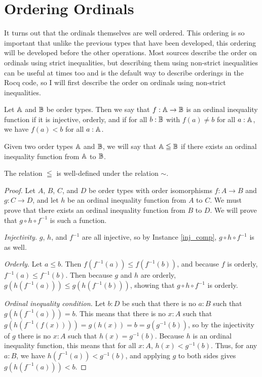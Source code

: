 \documentclass[../../math.tex]{subfiles}
\begin{document}
\section{Ordering Ordinals}

It turns out that the ordinals themselves are well ordered.  This ordering is so
important that unlike the previous types that have been developed, this ordering
will be developed before the other operations.  Most sources describe the order
on ordinals using strict inequalities, but describing them using non-strict
inequalities can be useful at times too and is the default way to describe
orderings in the Rocq code, so I will first describe the order on ordinals using
non-strict inequalities.

\begin{definition}
    Let $\mathbb{A}$ and $\mathbb{B}$ be order types.  Then we say that $f : \mathbb{A} \to \mathbb{B}$ is an
    ordinal inequality function if it is injective, orderly, and if for all $b :
    \mathbb{B}$ with $f(a) \neq b$ for all $a : \mathbb{A}$, we have $f(a) < b$ for all $a :
    \mathbb{A}$.
\end{definition}

\begin{definition}
    Given two order types $\mathbb{A}$ and $\mathbb{B}$, we will say that $\mathbb{A} \leqq \mathbb{B}$ if there
    exists an ordinal inequality function from $\mathbb{A}$ to $\mathbb{B}$.
\end{definition}

\begin{lemma}
    The relation $\leqq$ is well-defined under the relation $\sim$.
\end{lemma}
\begin{proof}
    Let $A$, $B$, $C$, and $D$ be order types with order isomorphisms $f : A \to
    B$ and $g : C \to D$, and let $h$ be an ordinal inequality function from $A$
    to $C$.  We must prove that there exists an ordinal inequality function from
    $B$ to $D$.  We will prove that $g \circ h \circ f^{-1}$ is such a function.

    \noindent \textit{Injectivity.}
    $g$, $h$, and $f^{-1}$ are all injective, so by Instance \ref{inj_comp}, $g
    \circ h \circ f^{-1}$ is as well.

    \noindent \textit{Orderly.}
    Let $a \leq b$.  Then $f(f^{-1}(a)) \leq f(f^{-1}(b))$, and because $f$ is
    orderly, $f^{-1}(a) \leq f^{-1}(b)$.  Then because $g$ and $h$ are orderly,
    $g(h(f^{-1}(a))) \leq g(h(f^{-1}(b)))$, showing that $g \circ h \circ
    f^{-1}$ is orderly.

    \noindent \textit{Ordinal inequality condition.}
    Let $b : D$ be such that there is no $a : B$ such that $g(h(f^{-1}(a))) =
    b$.  This means that there is no $x : A$ such that $g(h(f^{-1}(f(x)))) =
    g(h(x)) = b = g(g^{-1}(b))$, so by the injectivity of $g$ there is no $x :
    A$ such that $h(x) = g^{-1}(b)$.  Because $h$ is an ordinal inequality
    function, this means that for all $x : A$, $h(x) < g^{-1}(b)$.  Thus, for
    any $a : B$, we have $h(f^{-1}(a)) < g^{-1}(b)$, and applying $g$ to both
    sides gives $g(h(f^{-1}(a))) < b$.
\end{proof}
\end{document}
